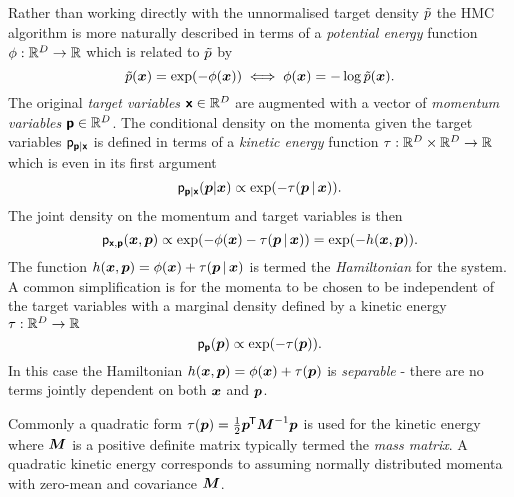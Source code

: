 Rather than working directly with the unnormalised target density $\tilde{p}$ the \ac{HMC} algorithm is more naturally described in terms of a \emph{potential energy} function $\phi : \mathbb{R}^D \to \mathbb{R}$ which is related to $\tilde{p}$ by
\begin{equation}\label{eq:boltzmann-gibbs-density}
  \utgtdens(\vct{x}) =  \exp\lpa -\phi(\vct{x}) \rpa \iff \phi(\vct{x}) = -\log \utgtdens(\vct{x}).
\end{equation}
The original \emph{target variables} $\boldsymbol{\mathsf{x}} \in \mathbb{R}^D$ are augmented with a vector of \emph{momentum variables} $\boldsymbol{\mathsf{p}} \in \mathbb{R}^D$. The conditional density on the momenta given the target variables $\mathsf{p}_{\boldsymbol{\mathsf{p}}|\boldsymbol{\mathsf{x}}}$ is defined in terms of a \emph{kinetic energy} function $\tau : \mathbb{R}^D \times \mathbb{R}^D \to \mathbb{R}$ which is even in its first argument
\begin{equation}
  \pden{\rvct{p}|\rvct{x}}(\vct{p}|\vct{x}) \propto \exp\lpa-\tau(\vct{p}\gvn\vct{x}) \rpa.
\end{equation}
The joint density on the momentum and target variables is then
\begin{equation}\label{eq:hmc-joint-density}
  \pden{\rvct{x},\rvct{p}}(\vct{x},\vct{p}) \propto
  \exp\lpa -\phi(\vct{x}) - \tau(\vct{p}\gvn\vct{x})\rpa = \exp\lpa -\hamiltonian(\vct{x},\vct{p})\rpa.
\end{equation}
The function $h(\boldsymbol{x},\boldsymbol{p}) = \phi(\boldsymbol{x}) + \tau(\boldsymbol{p}\operatorname{|}\boldsymbol{x})$ is termed the \emph{Hamiltonian} for the system. A common simplification is for the momenta to be chosen to be independent of the target variables with a marginal density defined by a kinetic energy $\tau : \mathbb{R}^D \to \mathbb{R}$  
\begin{equation}
  \pden{\rvct{p}}(\vct{p}) \propto\exp\lpa-\tau(\vct{p})\rpa.
\end{equation}
In this case the Hamiltonian $h(\boldsymbol{x},\boldsymbol{p}) = \phi(\boldsymbol{x}) + \tau(\boldsymbol{p})$ is \emph{separable} - there are no terms jointly dependent on both $\boldsymbol{x}$ and $\boldsymbol{p}$. 

Commonly a quadratic form 
\(
\tau(\boldsymbol{p}) = \frac{1}{2}\boldsymbol{p}^{\mkern-1.5mu\mathsf{T}}\boldsymbol{M}^{-1}\boldsymbol{p}
\)
is used for the kinetic energy where $\boldsymbol{M}$ is a positive definite matrix typically termed the \emph{mass matrix}. A quadratic kinetic energy corresponds to assuming normally distributed momenta with zero-mean and covariance $\boldsymbol{M}$.

